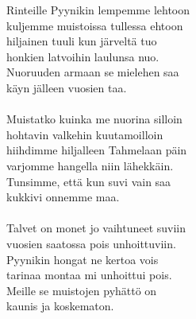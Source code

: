 
        Rinteille Pyynikin lempemme lehtoon \\
        kuljemme muistoissa tullessa ehtoon \\
        hiljainen tuuli kun järveltä tuo \\
        honkien latvoihin laulunsa nuo. \\
        Nuoruuden armaan se mielehen saa \\
        käyn jälleen vuosien taa. \\
\hspace{10mm} \\
        Muistatko kuinka me nuorina silloin \\
        hohtavin valkehin kuutamoilloin \\
        hiihdimme hiljalleen Tahmelaan päin \\
        varjomme hangella niin lähekkäin. \\
        Tunsimme, että kun suvi vain saa \\
        kukkivi onnemme maa. \\
\hspace{10mm} \\
        Talvet on monet jo vaihtuneet suviin \\
        vuosien saatossa pois unhoittuviin. \\
        Pyynikin hongat ne kertoa vois \\
        tarinaa montaa mi unhoittui pois. \\
        Meille se muistojen pyhättö on \\
        kaunis ja koskematon. \\
